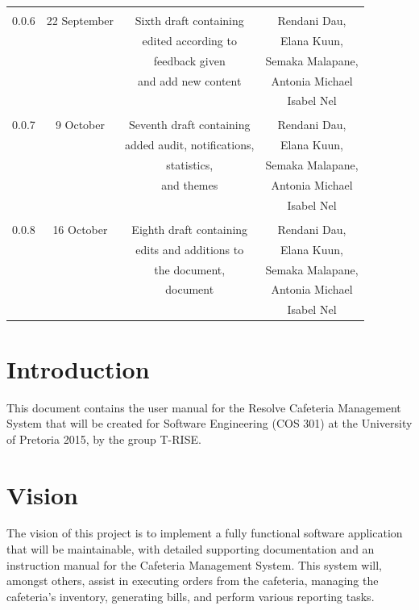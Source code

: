 \documentclass[a4paper,12pt]{report}
\begin{document}
\begin{table}[h!]
\begin{tabular}{||c c c c||}
  \hline 
 & & & \\
 0.0.6& 22 September &  Sixth draft containing  & Rendani Dau, \\ & & edited according to & Elana Kuun, \\ & & feedback given & Semaka Malapane, \\ & & and add new content &  Antonia Michael \\ & & & Isabel Nel \\   [1ex]  
 \hline 
 & & & \\
 0.0.7& 9 October &  Seventh draft containing  & Rendani Dau, \\ & & added audit, notifications, & Elana Kuun, \\ & & statistics, & Semaka Malapane, \\ & &  and themes &  Antonia Michael \\ & & & Isabel Nel \\   [1ex]  
 \hline 
 & & & \\
 0.0.8& 16 October &  Eighth draft containing  & Rendani Dau, \\ & & edits and additions to & Elana Kuun, \\ & & the document, & Semaka Malapane, \\ & &  document &  Antonia Michael \\ & & & Isabel Nel \\   [1ex]  
\hline
 \end{tabular}
\end{table}

\pagebreak
\pagebreak

\section{Introduction} 
This document contains the user manual for the Resolve Cafeteria Management System that will be created for Software Engineering (COS 301) at the University of Pretoria 2015, by the group T-RISE.

\section{Vision}
The vision of this project is to implement a fully functional software application that will be maintainable, with detailed supporting documentation and an instruction manual for the Cafeteria Management System. This system will, amongst others, assist in executing orders from the cafeteria, managing the cafeteria's inventory, generating bills, and perform various reporting tasks. 
\end{document}
